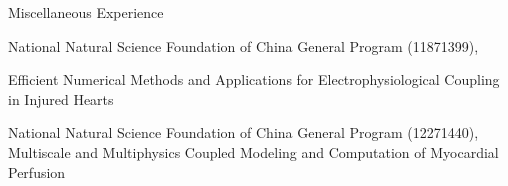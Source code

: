 \begin{rubric}{Miscellaneous Experience}



\entry*[2019.1--2022.12] National Natural Science Foundation of China General Program (11871399), \par
          Efficient Numerical Methods and Applications for Electrophysiological Coupling in Injured Hearts \par
\entry*[2023.1--2026.12] National Natural Science Foundation of China General Program (12271440), 
          Multiscale and Multiphysics Coupled Modeling and Computation of Myocardial Perfusion \par



\end{rubric}